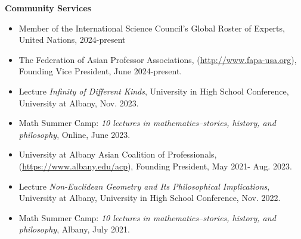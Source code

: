 \documentclass[12pt]{res} %
\begin{document}
\begin{resume}
\begin{itemize}
\end{itemize}

\textbf{Community Services}

\begin{itemize} \itemsep -2pt  %
\item Member of the International Science Council's Global Roster of Experts, United Nations, 2024-present
\item {The Federation of Asian Professor Associations}, (\url{http://www.fapa-usa.org}), Founding Vice President, June 2024-present.
\item {Lecture {\em Infinity of Different Kinds}}, University in High School Conference, University at Albany, Nov. 2023.
\item {Math Summer Camp: {\em 10 lectures in mathematics--stories, history, and philosophy}}, Online, June 2023.
\item {University at Albany Asian Coalition of Professionals}, (\url{https://www.albany.edu/acp}), Founding President, May 2021- Aug. 2023.
\item {Lecture {\em Non-Euclidean Geometry and Its Philosophical Implications}}, University at Albany, University in High School Conference, Nov. 2022.
\item {Math Summer Camp: {\em 10 lectures in mathematics--stories, history, and philosophy}}, Albany, July 2021.
\end{itemize} 

\end{resume}
\end{document}
